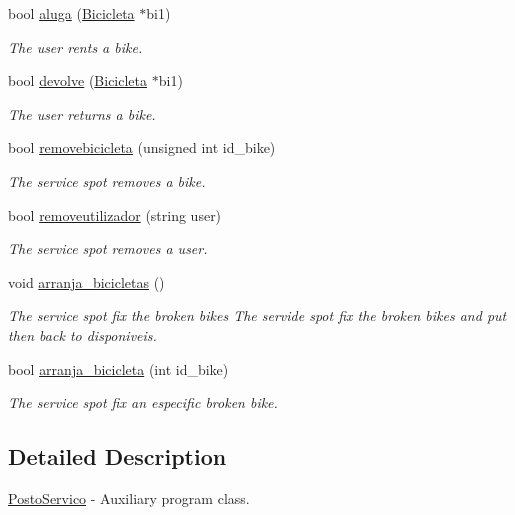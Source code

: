 \begin{DoxyCompactItemize}
bool \hyperlink{class_posto_servico_a30d51d2560c0239ecb513db121a604a7}{aluga} (\hyperlink{class_bicicleta}{Bicicleta} $\ast$bi1)
\begin{DoxyCompactList}\small\item\em The user rents a bike. \end{DoxyCompactList}\item 
bool \hyperlink{class_posto_servico_a9b7c97136f4b1e2cc7d90cbdb54c3f53}{devolve} (\hyperlink{class_bicicleta}{Bicicleta} $\ast$bi1)
\begin{DoxyCompactList}\small\item\em The user returns a bike. \end{DoxyCompactList}\item 
bool \hyperlink{class_posto_servico_a01c59324f65bf70ce5400718cde0791a}{removebicicleta} (unsigned int id\+\_\+bike)
\begin{DoxyCompactList}\small\item\em The service spot removes a bike. \end{DoxyCompactList}\item 
bool \hyperlink{class_posto_servico_a9cab807cf7fcecad5e8231abdb7ef491}{removeutilizador} (string user)
\begin{DoxyCompactList}\small\item\em The service spot removes a user. \end{DoxyCompactList}\item 
\hypertarget{class_posto_servico_a15a1ac03805060f0b2282e32c8f95da2}{void \hyperlink{class_posto_servico_a15a1ac03805060f0b2282e32c8f95da2}{arranja\+\_\+bicicletas} ()}\label{class_posto_servico_a15a1ac03805060f0b2282e32c8f95da2}

\begin{DoxyCompactList}\small\item\em The service spot fix the broken bikes The servide spot fix the broken bikes and put then back to disponiveis. \end{DoxyCompactList}\item 
bool \hyperlink{class_posto_servico_a116efc301c6955001083ba199ed96ed2}{arranja\+\_\+bicicleta} (int id\+\_\+bike)
\begin{DoxyCompactList}\small\item\em The service spot fix an especific broken bike. \end{DoxyCompactList}\end{DoxyCompactItemize}


\subsection{Detailed Description}
\hyperlink{class_posto_servico}{Posto\+Servico} -\/ Auxiliary program class. 

